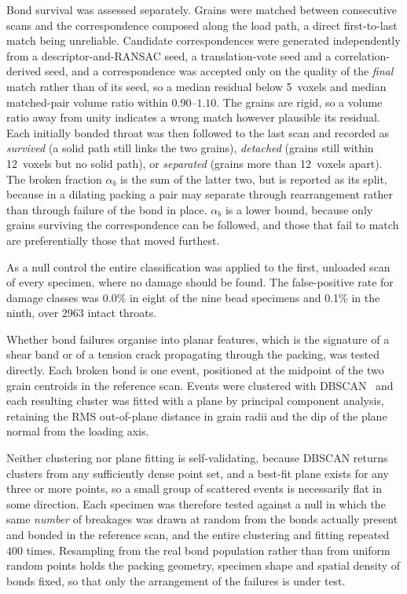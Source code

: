 \documentclass[preprint,12pt,numbers]{elsarticle}
\begin{document}
  Bond survival was assessed separately.  Grains were matched between
  consecutive scans and the correspondence composed along the load path, a
  direct first-to-last match being unreliable.  Candidate correspondences were
  generated independently from a descriptor-and-RANSAC seed, a translation-vote
  seed and a correlation-derived seed, and a correspondence was accepted only on
  the quality of the \emph{final} match rather than of its seed, so a median residual
  below 5~voxels and median matched-pair volume ratio within $0.90$--$1.10$.
  The grains are rigid, so a volume ratio away from unity indicates a wrong
  match however plausible its residual.  Each initially bonded throat was then
  followed to the last scan and recorded as
  \emph{survived} (a solid path still links the two grains),
  \emph{detached} (grains still within 12~voxels but no solid path), or
  \emph{separated} (grains more than 12~voxels apart).  The broken fraction
  $\alpha_b$ is the sum of the latter two, but is reported as its split, because
  in a dilating packing a pair may separate through rearrangement rather than
  through failure of the bond in place.  $\alpha_b$ is a lower bound, because only
  grains surviving the correspondence can be followed, and those that fail to
  match are preferentially those that moved furthest.

  As a null control the entire classification was applied to the first,
  unloaded scan of every specimen, where no damage should be found. The
  false-positive rate for damage classes was 0.0\% in eight of the nine bead
  specimens and 0.1\% in the ninth, over 2963 intact throats.

  Whether bond failures organise into planar features, which is the signature
  of a shear band or of a tension crack propagating through the packing, was
  tested directly.  Each broken bond is one event, positioned at the midpoint of
  the two grain centroids in the reference scan.  Events were clustered with
  DBSCAN~\cite{Pedregosa2011} and each resulting cluster was fitted with a plane
  by principal component analysis, retaining the RMS out-of-plane distance in
  grain radii and the dip of the plane normal from the loading axis.

  Neither clustering nor plane fitting is self-validating, because DBSCAN returns
  clusters from any sufficiently dense point set, and a best-fit plane exists for
  any three or more points, so a small group of scattered events is necessarily
  flat in some direction.  Each specimen was therefore tested against a null in
  which the same \emph{number} of breakages was drawn at random from the bonds
  actually present and bonded in the reference scan, and the entire clustering
  and fitting repeated 400 times.  Resampling from the real bond population
  rather than from uniform random points holds the packing geometry, specimen
  shape and spatial density of bonds fixed, so that only the arrangement of the
  failures is under test.
\end{document}
